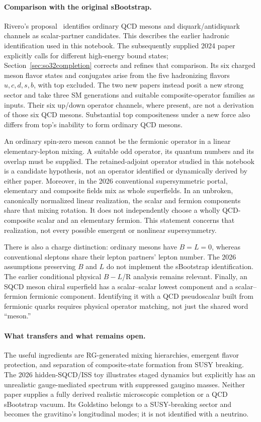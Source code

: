 \paragraph{Comparison with the original sBootstrap.}
Rivero's proposal~\cite{Rivero2005,Rivero2009} identifies ordinary QCD
mesons and diquark/antidiquark channels as scalar-partner candidates.
This describes the earlier hadronic identification used in this
notebook. The subsequently supplied 2024 paper explicitly calls for
different high-energy bound states; Section~\ref{sec:so32completion}
corrects and refines that comparison.
Its six charged meson flavor states and conjugates arise from the five
hadronizing flavors $u,c,d,s,b$, with top excluded. The two new papers
instead posit a new strong sector and take three SM generations and
suitable composite-operator families as inputs. Their six up/down
operator channels, where present, are not a derivation of those six
QCD mesons. Substantial top compositeness under a new force also differs
from top's inability to form ordinary QCD mesons.

An ordinary spin-zero meson cannot be the fermionic operator in a
linear elementary-lepton mixing. A suitable odd operator, its quantum
numbers and its overlap must be supplied. The retained-adjoint operator
studied in this notebook is a candidate hypothesis, not an operator
identified or dynamically derived by either paper.
Moreover, in the 2026 conventional supersymmetric portal, elementary
and composite fields mix as whole superfields. In an unbroken,
canonically normalized linear realization, the scalar and fermion
components share that mixing rotation. It does not independently
choose a wholly QCD-composite scalar and an elementary fermion.
This statement concerns that realization, not every possible emergent
or nonlinear supersymmetry.

There is also a charge distinction: ordinary mesons have $B=L=0$,
whereas conventional sleptons share their lepton partners' lepton
number. The 2026 assumptions preserving $B$ and $L$ do not implement
the sBootstrap identification. The earlier conditional physical
$B-L$/R analysis remains relevant. Finally, an SQCD meson chiral
superfield has a scalar--scalar lowest component and a
scalar--fermion fermionic component. Identifying it with a QCD
pseudoscalar built from fermionic quarks requires physical operator
matching, not just the shared word ``meson.''

\paragraph{What transfers and what remains open.}
The useful ingredients are RG-generated mixing hierarchies, emergent
flavor protection, and separation of composite-state formation from
SUSY breaking. The 2026 hidden-SQCD/ISS toy illustrates staged dynamics
but explicitly has an unrealistic gauge-mediated spectrum with
suppressed gaugino masses. Neither paper supplies a fully derived
realistic microscopic completion or a QCD sBootstrap vacuum.
Its Goldstino belongs to a SUSY-breaking sector and becomes the
gravitino's longitudinal modes; it is not identified with a neutrino.

